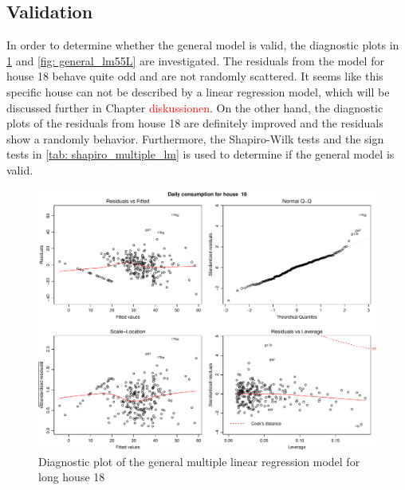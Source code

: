 \subsection{Validation}
In order to determine whether the general model is valid, the diagnostic plots in \cref{fig: general_lm18L} and \cref{fig: general_lm55L} are investigated. The residuals from the model for house 18 behave quite odd and are not randomly scattered. It seems like this specific house can not be described by a linear regression model, which will be discussed further in Chapter \textcolor{red}{diskussionen}. On the other hand, the diagnostic plots of the residuals from house 18 are definitely improved and the residuals show a randomly behavior. Furthermore, the Shapiro-Wilk tests and the sign tests in \cref{tab: shapiro_multiple_lm} is used to determine if the general model is valid.
\begin{figure}
    \centering
    \includegraphics[width=1.\textwidth]{../../../figures/general_lm18L.pdf}
    \caption{Diagnostic plot of the general multiple linear regression model for long house 18}
    \label{fig: general_lm18L}
\end{figure}
